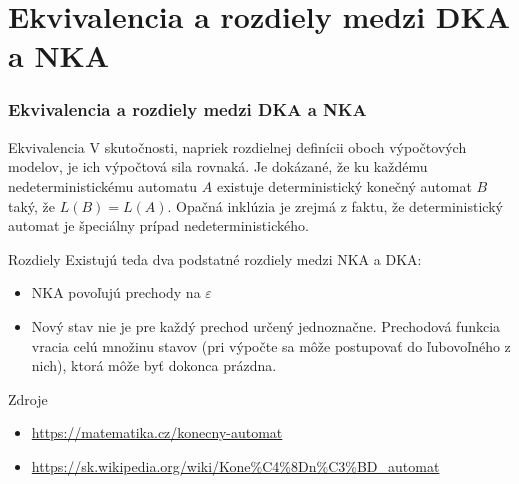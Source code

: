 \documentclass[slovak]{beamer}
\begin{document}
\section{Ekvivalencia a rozdiely medzi DKA a NKA}
\frame
{
    \frametitle{Ekvivalencia a rozdiely medzi DKA a NKA}
    \begin{block}{Ekvivalencia}
    V skutočnosti, napriek rozdielnej definícii oboch výpočtových modelov, je ich výpočtová sila rovnaká. Je dokázané, že ku každému nedeterministickému automatu $A$ existuje deterministický konečný automat $B$ taký, že $L(B) = L(A)$. Opačná inklúzia je zrejmá z faktu, že deterministický automat je špeciálny prípad nedeterministického.
    \end{block}
    \begin{block}{Rozdiely}
    Existujú teda dva podstatné rozdiely medzi NKA a DKA:
    \begin{itemize}
        \item NKA povoľujú prechody na $\varepsilon$
        \item Nový stav nie je pre každý prechod určený jednoznačne. Prechodová funkcia vracia celú množinu stavov (pri výpočte sa môže postupovať do ľubovoľného z nich), ktorá môže byť dokonca prázdna.
    \end{itemize}
    \end{block}
}

\begin{frame}{Zdroje}
\begin{itemize}
\item \url{https://matematika.cz/konecny-automat}
\item \url{https://sk.wikipedia.org/wiki/Kone\%C4\%8Dn\%C3\%BD_automat}
\end{itemize}

\end{frame}
\end{document}
